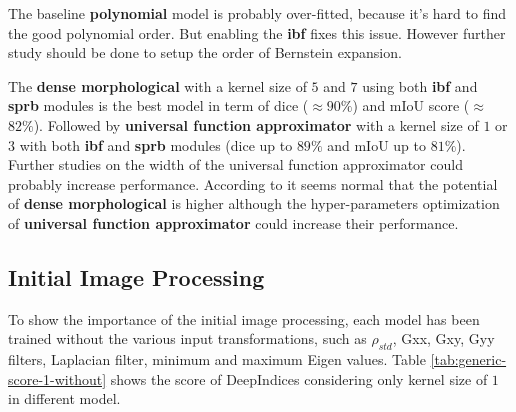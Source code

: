 \documentclass[../thesis.tex]{subfiles}
\begin{document}
	The baseline \textbf{polynomial} model is probably over-fitted, because it's hard to find the good polynomial order. But enabling the \textbf{ibf} fixes this issue. However further study should be done to setup the order of Bernstein expansion.
	
	The \textbf{dense morphological} with a kernel size of $5$ and $7$ using both \textbf{ibf} and \textbf{sprb} modules is the best model in term of dice ($\approx$$90\%$) and mIoU score ($\approx$$82\%$). Followed by \textbf{universal function approximator} with a kernel size of $1$ or $3$ with both \textbf{ibf} and \textbf{sprb} modules (dice up to $89\%$ and mIoU up to $81\%$). Further studies on the width of the universal function approximator could probably increase performance. According to \cite{DenseMorpho} it seems normal that the potential of \textbf{dense morphological} is higher although the hyper-parameters optimization of \textbf{universal function approximator} could increase their performance.
	
	\newpage
	\subsection{Initial Image Processing} To show the importance of the initial image processing, each model has been trained without the various input transformations, such as $\rho_{std}$, Gxx, Gxy, Gyy filters, Laplacian filter, minimum and maximum Eigen values. Table \ref{tab:generic-score-1-without} shows the score of DeepIndices considering only kernel size of $1$ in different model.
	
\end{document}

